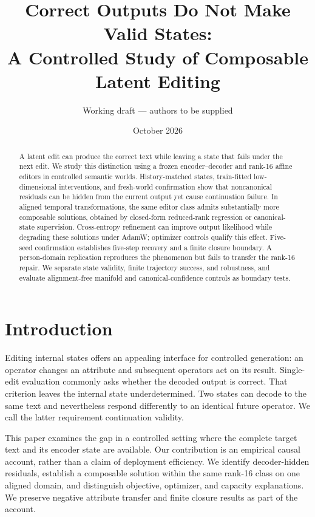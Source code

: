 \documentclass[11pt]{article}
\title{Correct Outputs Do Not Make Valid States:\\A Controlled Study of Composable Latent Editing}
\author{Working draft --- authors to be supplied}
\date{October 2026}
\begin{document}
\maketitle
\begin{abstract}
A latent edit can produce the correct text while leaving a state that fails under
the next edit. We study this distinction using a frozen encoder--decoder and
rank-16 affine editors in controlled semantic worlds. History-matched states,
train-fitted low-dimensional interventions, and fresh-world confirmation show
that noncanonical residuals can be hidden from the current output yet cause
continuation failure. In aligned temporal transformations, the same editor class
admits substantially more composable solutions, obtained by closed-form
reduced-rank regression or canonical-state supervision. Cross-entropy refinement
can improve output likelihood while degrading these solutions under AdamW;
optimizer controls qualify this effect. Five-seed confirmation establishes
five-step recovery and a finite closure boundary. A person-domain replication
reproduces the phenomenon but fails to transfer the rank-16 repair. We separate
state validity, finite trajectory success, and robustness, and evaluate
alignment-free manifold and canonical-confidence controls as boundary tests.
\end{abstract}

\section{Introduction}
Editing internal states offers an appealing interface for controlled generation:
an operator changes an attribute and subsequent operators act on its result.
Single-edit evaluation commonly asks whether the decoded output is correct.
That criterion leaves the internal state underdetermined. Two states can decode
to the same text and nevertheless respond differently to an identical future
operator. We call the latter requirement continuation validity.

This paper examines the gap in a controlled setting where the complete target
text and its encoder state are available. Our contribution is an empirical
causal account, rather than a claim of deployment efficiency. We identify
decoder-hidden residuals, establish a composable solution within the same
rank-16 class on one aligned domain, and distinguish objective, optimizer, and
capacity explanations. We preserve negative attribute transfer and finite
closure results as part of the account.
\end{document}
